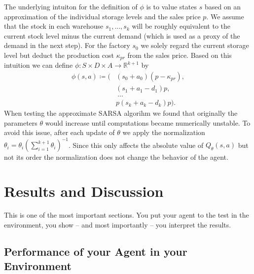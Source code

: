 \documentclass[journal, a4paper]{IEEEtran}
\makeatletter
\theoremstyle{plain}
\theoremstyle{definition}
\def\BState{\State\hskip-\ALG@thistlm}
\makeatother
\begin{document}
The underlying intuiton for the definition of $\phi$ is to value states $s$ based on an approximation of the individual storage levels and the sales price $p$. We assume that the stock in each warehouse $s_1,..., s_k$ will be roughly equivalent to the current stock level minus the current demand (which is used as a proxy of the demand in the next step). For the factory $s_0$ we solely regard the current storage level but deduct the production cost $\kappa_{pr}$ from the sales price. Based on this intuition we can define $\phi: S \times D \times A \rightarrow \mathbb{R}^{k+1}$ by
\begin{equation}
	\label{eq:sarsa_phi}
	\begin{split}
	\phi(s, a) \coloneqq (&(s_0 + a_0)(p - \kappa_{pr}), \\
	&(s_1 + a_1 - d_1)p, \\
	&\ ... \\
	&p (s_k + a_k - d_k)p ).
	\end{split}
\end{equation} 
When testing the approximate SARSA algorihm we found that originally the parameters $\theta$ would increase until computations became numerically unstable. To avoid this issue, after each update of $\theta$ we apply the normalization $\theta_i = \theta_i (\sum_{i=1}^{k+1} \theta_i)^{-1}$. Since this only affects the absolute value of $Q_{\theta}(s,a)$ but not its order the normalization does not change the behavior of the agent.
\section{Results and Discussion}



This is one of the most important sections. You put your agent to the test in the environment, you show -- and most importantly -- you interpret the results.

\subsection{Performance of your Agent in your Environment}
\end{document}
